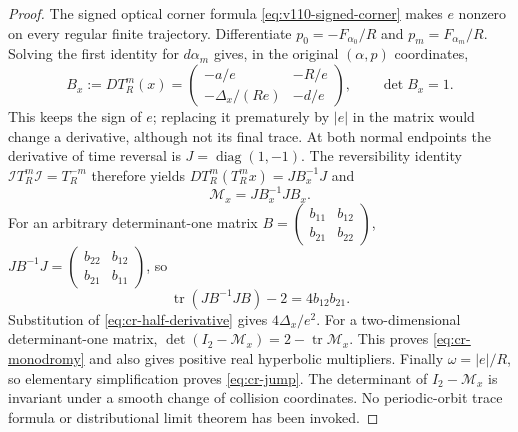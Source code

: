 \begin{proof}
The signed optical corner formula \eqref{eq:v110-signed-corner}
makes $e$ nonzero on every regular finite trajectory. Differentiate
$p_0=-F_{\alpha_0}/R$ and $p_m=F_{\alpha_m}/R$. Solving the first
identity for $d\alpha_m$ gives, in the original $(\alpha,p)$
coordinates,
\begin{equation}\label{eq:cr-half-derivative}
 B_x:=D T_R^m(x)
  =\begin{pmatrix}
       -a/e&-R/e\\-\Delta_x/(Re)&-d/e
    \end{pmatrix},\qquad \det B_x=1.
\end{equation}
This keeps the sign of $e$; replacing it prematurely by $|e|$ in
the matrix would change a derivative, although not its final trace.
At both normal endpoints the derivative of time reversal is
$J=\operatorname{diag}(1,-1)$. The reversibility identity
$\mathcal I T_R^m\mathcal I=T_R^{-m}$ therefore yields
$D T_R^m(T_R^m x)=J B_x^{-1}J$ and
\[
 \mathcal M_x=J B_x^{-1}J B_x.
\]
For an arbitrary determinant-one matrix
$B=\left(\begin{smallmatrix}b_{11}&b_{12}\\b_{21}&b_{22}\end{smallmatrix}\right)$,
$J B^{-1}J=\left(\begin{smallmatrix}b_{22}&b_{12}\\b_{21}&b_{11}\end{smallmatrix}\right)$,
so
\[
 \operatorname{tr}(J B^{-1}J B)-2=4b_{12}b_{21}.
\]
Substitution of \eqref{eq:cr-half-derivative} gives
$4\Delta_x/e^2$. For a two-dimensional determinant-one matrix,
$\det(I_2-\mathcal M_x)=2-\operatorname{tr}\mathcal M_x$.
This proves \eqref{eq:cr-monodromy} and also gives positive real
hyperbolic multipliers. Finally $\omega=|e|/R$, so elementary
simplification proves \eqref{eq:cr-jump}. The determinant of
$I_2-\mathcal M_x$ is invariant under a smooth change of collision
coordinates. No periodic-orbit trace formula or distributional
limit theorem has been invoked.
\end{proof}

